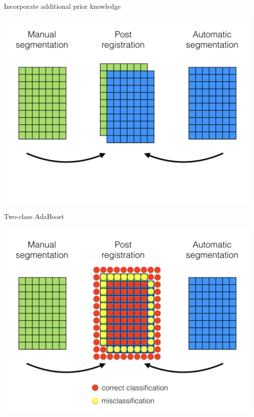 \documentclass[ignorenonframetext,]{beamer}
\begin{document}
\begin{frame}{Incorporate additional prior knowledge}

\centering
\includegraphics[width=0.85 \textwidth]{../Figures/correctiveLearning001.png}

\end{frame}

\begin{frame}{Two-class AdaBoost}

\centering
\includegraphics[width=0.85 \textwidth]{../Figures/correctiveLearning002.png}

\end{frame}
\end{document}
